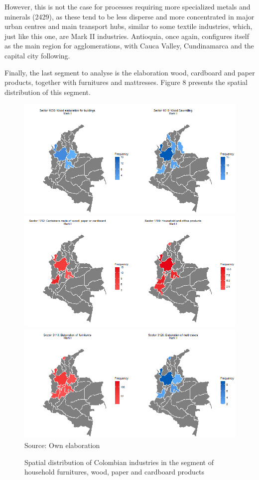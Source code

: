 \documentclass[12pt,a4paper]{article}
\begin{document}
However, this is not the case for processes requiring more specialized metals and minerals (2429), as these tend to be less disperse and more concentrated in major urban centres and main transport hubs, similar to some textile industries, which, just like this one, are Mark II industries. Antioquia, once again, configures itself as the main region for agglomerations, with Cauca Valley, Cundinamarca and the capital city following. 

Finally, the last segment to analyse is the elaboration wood, cardboard and paper products, together with furnitures and mattresses. Figure 8 presents the spatial distribution of this segment. 


\begin{figure}
	\caption{Spatial distribution of Colombian industries in the segment of household furnitures, wood, paper and cardboard products}
	\centering
	\includegraphics[scale=0.6]{woodcard1} \\
	\includegraphics[scale=0.6]{woodcard2} \\
	\includegraphics[scale=0.6]{furnit} \\
	Source: Own elaboration
\end{figure}
\end{document}
